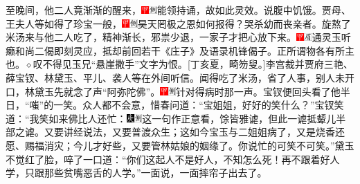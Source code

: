 至晚间，他二人竟渐渐的醒来，{\includegraphics[width=3mm]{../Images/00002}\includegraphics[width=3mm]{../Images/00011}\footnotesize \kaishu 能领持诵，故如此灵效。}说腹中饥饿。贾母、王夫人等如得了珍宝一般，{\includegraphics[width=3mm]{../Images/00002}\includegraphics[width=3mm]{../Images/00011}\footnotesize \kaishu 昊天罔极之恩如何报得？哭杀幼而丧亲者。}旋熬了米汤来与他二人吃了，精神渐长，邪祟少退，一家子才把心放下来。{\includegraphics[width=3mm]{../Images/00002}\includegraphics[width=3mm]{../Images/00010}\footnotesize \kaishu 通灵玉听癞和尚二偈即刻灵应，抵却前回若干《庄子》及语录机锋偈子。正所谓物各有所主也。{$\diamond$}叹不得见玉兄“悬崖撒手”文字为恨。{[}丁亥夏，畸笏叟。{]}}李宫裁并贾府三艳、薛宝钗、林黛玉、平儿、袭人等在外间听信。闻得吃了米汤，省了人事，别人未开口，林黛玉先就念了声“阿弥陀佛”。{\includegraphics[width=3mm]{../Images/00002}\includegraphics[width=3mm]{../Images/00011}\footnotesize \kaishu 针对得病时那一声。}宝钗便回头看了他半日，“嗤”的一笑。众人都不会意，惜春问道：“宝姐姐，好好的笑什么？”宝钗笑道：“我笑如来佛比人还忙：{\includegraphics[width=3mm]{../Images/00004}\includegraphics[width=3mm]{../Images/00011}\footnotesize \kaishu 这一句作正意看，馀皆雅谑，但此一谑抵颦儿半部之谑。}又要讲经说法，又要普渡众生；这如今宝玉与二姐姐病了，又是烧香还愿、赐福消灾；今儿才好些，又要管林姑娘的姻缘了。你说忙的可笑不可笑。”黛玉不觉红了脸，啐了一口道：“你们这起人不是好人，不知怎么死！再不跟着好人学，只跟那些贫嘴恶舌的人学。”一面说，一面摔帘子出去了。

